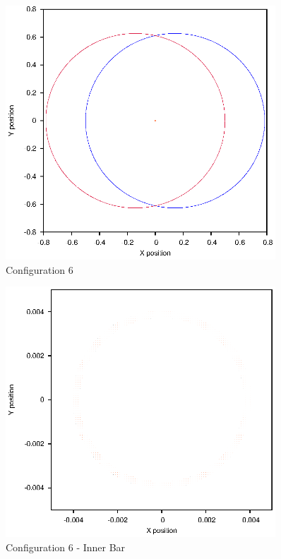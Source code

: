 \documentclass[a4paper,12pt]{article}
\begin{document}
\begin{figure}[H]
\centering
\includegraphics[width=0.9\textwidth]{./results/004-57-004/Orbit.eps}
\caption{Configuration 6}
\label{fig:config6}
\end{figure}
\begin{figure}[H]
\centering
\includegraphics[width=0.9\textwidth]{./results/004-57-004/Inner.eps}
\caption{Configuration 6 - Inner Bar}
\label{fig:config6i}
\end{figure}
\end{document}
